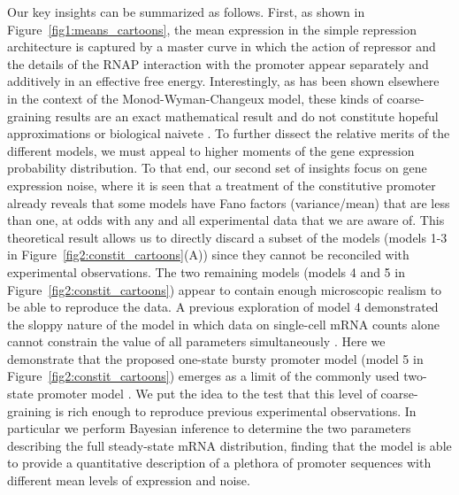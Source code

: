 Our key insights can be summarized as follows. First, as shown in
Figure~\ref{fig1:means_cartoons}, the mean expression in the simple repression
architecture is captured by a master curve in which the action of repressor and
the details of the RNAP interaction with the promoter appear separately and
additively in an effective free energy. Interestingly, as has been shown
elsewhere in the context of the Monod-Wyman-Changeux model, these kinds of
coarse-graining results are an exact mathematical result and do not constitute
hopeful approximations or biological naivete \cite{Razo-Mejia2018, Chure2019}.
To further dissect the relative merits of the different models, we must appeal
to higher moments of the gene expression probability distribution. To that end,
our second set of insights focus on gene expression noise, where it is seen that
a treatment of the constitutive promoter already reveals that some models have
Fano factors (variance/mean) that are less than one, at odds with any and all
experimental data that we are aware of\cite{So2011, Jones2014}. This theoretical
result allows us to directly discard a subset of the models (models 1-3 in
Figure~\ref{fig2:constit_cartoons}(A)) since they cannot be reconciled with
experimental observations. The two remaining models (models 4 and 5 in
Figure~\ref{fig2:constit_cartoons}) appear to contain enough microscopic realism
to be able to reproduce the data. A previous exploration of model 4 demonstrated
the sloppy nature of the model in which data on single-cell mRNA counts alone
cannot constrain the value of all parameters simultaneously
\cite{Razo-Mejia2020}. Here we demonstrate that the proposed one-state bursty
promoter model (model 5 in Figure~\ref{fig2:constit_cartoons}) emerges as a
limit of the commonly used two-state promoter model \cite{Peccoud1995,
Shahrezaei2008, So2011, Sanchez2013, Jones2014}. We put the idea to the test
that this level of coarse-graining is rich enough to reproduce previous
experimental observations. In particular we perform Bayesian inference to
determine the two parameters describing the full steady-state mRNA distribution,
finding that the model is able to provide a quantitative description of a
plethora of promoter sequences with different mean levels of expression and
noise.

